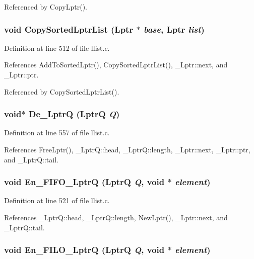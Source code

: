 Referenced by Copy\-Lptr().
\subsubsection{\setlength{\rightskip}{0pt plus 5cm}void Copy\-Sorted\-Lptr\-List (\bf{Lptr} $\ast$ {\em base}, \bf{Lptr} {\em list})}\label{llist_8c_b2a3ee93556ce740ce28a0d435870f00}




Definition at line 512 of file llist.c.

References Add\-To\-Sorted\-Lptr(), Copy\-Sorted\-Lptr\-List(), \_\-Lptr::next, and \_\-Lptr::ptr.

Referenced by Copy\-Sorted\-Lptr\-List().
\subsubsection{\setlength{\rightskip}{0pt plus 5cm}void$\ast$ De\_\-Lptr\-Q (\bf{Lptr\-Q} {\em Q})}\label{llist_8c_f2f49bfc7d15d1509fa211315b2c8fbb}




Definition at line 557 of file llist.c.

References Free\-Lptr(), \_\-Lptr\-Q::head, \_\-Lptr\-Q::length, \_\-Lptr::next, \_\-Lptr::ptr, and \_\-Lptr\-Q::tail.
\subsubsection{\setlength{\rightskip}{0pt plus 5cm}void En\_\-FIFO\_\-Lptr\-Q (\bf{Lptr\-Q} {\em Q}, void $\ast$ {\em element})}\label{llist_8c_51cc585ba57433ad0eed03a34134f18d}




Definition at line 521 of file llist.c.

References \_\-Lptr\-Q::head, \_\-Lptr\-Q::length, New\-Lptr(), \_\-Lptr::next, and \_\-Lptr\-Q::tail.
\subsubsection{\setlength{\rightskip}{0pt plus 5cm}void En\_\-FILO\_\-Lptr\-Q (\bf{Lptr\-Q} {\em Q}, void $\ast$ {\em element})}\label{llist_8c_c5d084ccd8baa0b52d602718a9e0b9d8}




